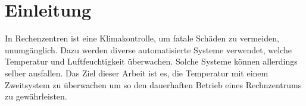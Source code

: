 \section{Einleitung}
In Rechenzentren ist eine Klimakontrolle, um fatale Schäden zu vermeiden, unumgänglich. Dazu werden diverse automatisierte Systeme verwendet, welche Temperatur und Luftfeuchtigkeit überwachen. Solche Systeme können allerdings selber ausfallen. Das Ziel dieser Arbeit ist es, die Temperatur mit einem Zweitsystem zu überwachen um so den dauerhaften Betrieb eines Rechnzentrums zu gewährleisten.\\
\newpage